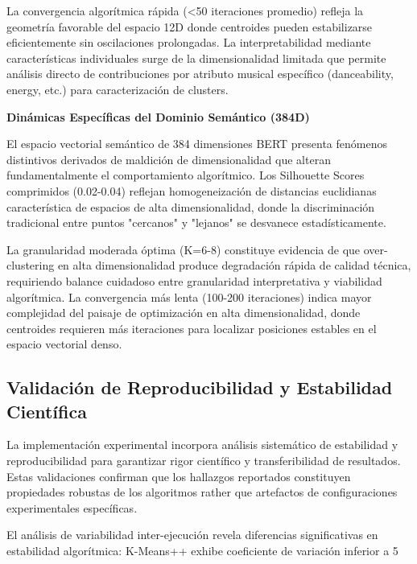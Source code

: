\documentclass[12pt,a4paper]{report}
\begin{document}
La convergencia algorítmica rápida (<50 iteraciones promedio) refleja la geometría favorable del espacio 12D donde centroides pueden estabilizarse eficientemente sin oscilaciones prolongadas. La interpretabilidad mediante características individuales surge de la dimensionalidad limitada que permite análisis directo de contribuciones por atributo musical específico (danceability, energy, etc.) para caracterización de clusters.

\textbf{Dinámicas Específicas del Dominio Semántico (384D)}

El espacio vectorial semántico de 384 dimensiones BERT presenta fenómenos distintivos derivados de maldición de dimensionalidad que alteran fundamentalmente el comportamiento algorítmico. Los Silhouette Scores comprimidos (0.02-0.04) reflejan homogeneización de distancias euclidianas característica de espacios de alta dimensionalidad, donde la discriminación tradicional entre puntos "cercanos" y "lejanos" se desvanece estadísticamente.

La granularidad moderada óptima (K=6-8) constituye evidencia de que over-clustering en alta dimensionalidad produce degradación rápida de calidad técnica, requiriendo balance cuidadoso entre granularidad interpretativa y viabilidad algorítmica. La convergencia más lenta (100-200 iteraciones) indica mayor complejidad del paisaje de optimización en alta dimensionalidad, donde centroides requieren más iteraciones para localizar posiciones estables en el espacio vectorial denso.

\subsection{Validación de Reproducibilidad y Estabilidad Científica}

La implementación experimental incorpora análisis sistemático de estabilidad y reproducibilidad para garantizar rigor científico y transferibilidad de resultados. Estas validaciones confirman que los hallazgos reportados constituyen propiedades robustas de los algoritmos rather que artefactos de configuraciones experimentales específicas.

El análisis de variabilidad inter-ejecución revela diferencias significativas en estabilidad algorítmica: K-Means++ exhibe coeficiente de variación inferior a 5%
\end{document}
